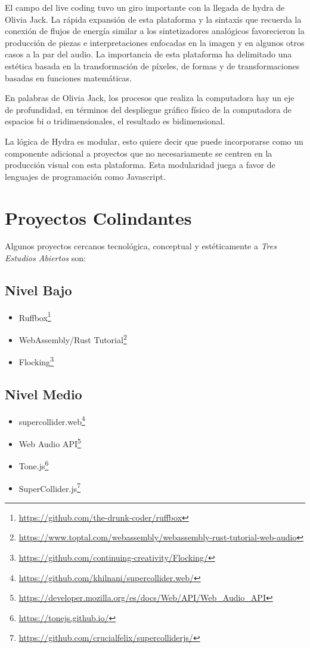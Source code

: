 El campo del live coding tuvo un giro importante con la llegada de hydra de Olivia Jack. La rápida expansión de esta plataforma y la sintaxis que recuerda la conexión de flujos de energía similar a los sintetizadores analógicos favorecieron la producción de piezas e interpretaciones enfocadas en la imagen y en algunos otros casos a la par del audio. La importancia de esta plataforma ha delimitado una estética  basada en  la transformación de píxeles, de formas y de transformaciones basadas en funciones matemáticas.

En palabras de Olivia Jack, los procesos que realiza la computadora hay un eje de profundidad, en términos del despliegue gráfico físico de la computadora de espacios bi o tridimensionales, el resultado es bidimensional.

La lógica de Hydra es modular, esto quiere decir que puede incorporarse como un componente adicional a proyectos que no necesariamente se centren en la producción visual con esta plataforma. Esta modularidad juega a favor de lenguajes de programación como Javascript. 

\section{Proyectos Colindantes}

Algunos proyectos cercanos tecnológica, conceptual y estéticamente a \emph{Tres Estudios Abiertos} son: 

\subsection{Nivel Bajo}

\begin{itemize}

\item Ruffbox\footnote{\url{https://github.com/the-drunk-coder/ruffbox}}
\item WebAssembly/Rust Tutorial\footnote{\url{https://www.toptal.com/webassembly/webassembly-rust-tutorial-web-audio}}
\item Flocking\footnote{\url{https://github.com/continuing-creativity/Flocking/}}
\end{itemize}

\subsection{Nivel Medio}

\begin{itemize}

\item supercollider.web\footnote{\url{https://github.com/khilnani/supercollider.web/}}
\item Web Audio API\footnote{\url{https://developer.mozilla.org/es/docs/Web/API/Web_Audio_API}}
\item Tone.js\footnote{\url{https://tonejs.github.io/}}
\item SuperCollider.js\footnote{\url{https://github.com/crucialfelix/supercolliderjs/}}
  
\end{itemize}

